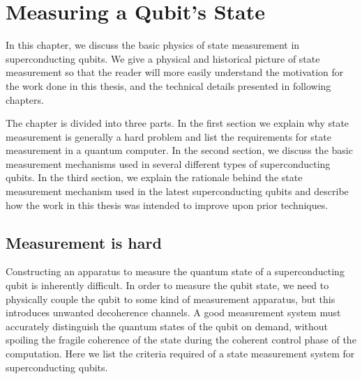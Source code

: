 \chapter{Measuring a Qubit's State} \label{ch:MeasuringQubitState}

In this chapter, we discuss the basic physics of state measurement in superconducting qubits.
We give a physical and historical picture of state measurement so that the reader will more easily understand the motivation for the work done in this thesis, and the technical details presented in following chapters.

The chapter is divided into three parts.
In the first section we explain why state measurement is generally a hard problem and list the requirements for state measurement in a quantum computer.
In the second section, we discuss the basic measurement mechanisms used in several different types of superconducting qubits.
In the third section, we explain the rationale behind the state measurement mechanism used in the latest superconducting qubits and describe how the work in this thesis was intended to improve upon prior techniques.

\section{Measurement is hard}

Constructing an apparatus to measure the quantum state of a superconducting qubit is inherently difficult.
In order to measure the qubit state, we need to physically couple the qubit to some kind of measurement apparatus, but this introduces unwanted decoherence channels.
A good measurement system must accurately distinguish the quantum states of the qubit on demand, without spoiling the fragile coherence of the state during the coherent control phase of the computation.
Here we list the criteria required of a state measurement system for superconducting qubits.

